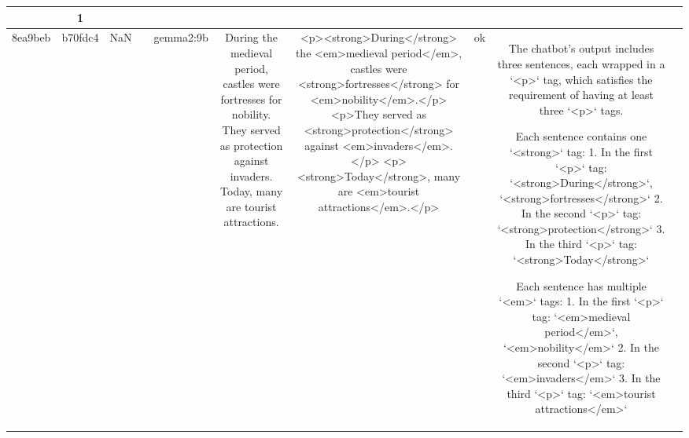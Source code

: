 \begin{table}[h!]
\begin{tabular}{|c|c|c|c|c|c|c|c|c|c|}
{{Upon analyzing the chatbot output:

1. There are three `<p>` tags present:
   - `<p><strong>During the medieval period</strong>, <em>castles</em> were <em>fortresses</em> for <em>nobility</em>.</p>`
   - `<p>They served as <strong>protection</strong> against <em>invaders</em>.</p>`
   - `<p>Today, many are <strong>tourist attractions</strong>.</p>`

2. Each `<p>` tag contains the following:
   - The first `<p>` tag has one `<strong>` tag and three `<em>` tags.
   - The second `<p>` tag has one `<strong>` tag and one `<em>` tag.
   - The third `<p>` tag has one `<strong>` tag, but it does not have any `<em>` tags.

Since the third `<p>` tag does not contain any `<em>` tags, it does not fully comply with the requirement to have multiple `<em>` tags within each `<p>` tag. Therefore, this output violates the description requirement that each `<p>` tag should have multiple `<em>` tags.

There is a clear violation of the guideline requiring each `<p>` tag to contain multiple `<em>` tags. Thus, based on the evaluation of whether the output complies with the description, the result is a non-compliance.

ERR & 1\\
\hline
8ea9beb & b70fdc4 & NaN &  & gemma2:9b & During the medieval period, castles were fortresses for nobility. They served as protection against invaders. Today, many are tourist attractions. & <p><strong>During</strong> the <em>medieval period</em>, castles were <strong>fortresses</strong> for <em>nobility</em>.</p> 
<p>They served as <strong>protection</strong> against <em>invaders</em>.</p> 
<p><strong>Today</strong>, many are <em>tourist attractions</em>.</p>  


 & ok & The chatbot's output includes three sentences, each wrapped in a `<p>` tag, which satisfies the requirement of having at least three `<p>` tags.

Each sentence contains one `<strong>` tag:
1. In the first `<p>` tag: `<strong>During</strong>`, `<strong>fortresses</strong>`
2. In the second `<p>` tag: `<strong>protection</strong>`
3. In the third `<p>` tag: `<strong>Today</strong>`

Each sentence has multiple `<em>` tags:
1. In the first `<p>` tag: `<em>medieval period</em>`, `<em>nobility</em>`
2. In the second `<p>` tag: `<em>invaders</em>`
3. In the third `<p>` tag: `<em>tourist attractions</em>`

}}
\end{tabular}
\end{table}
